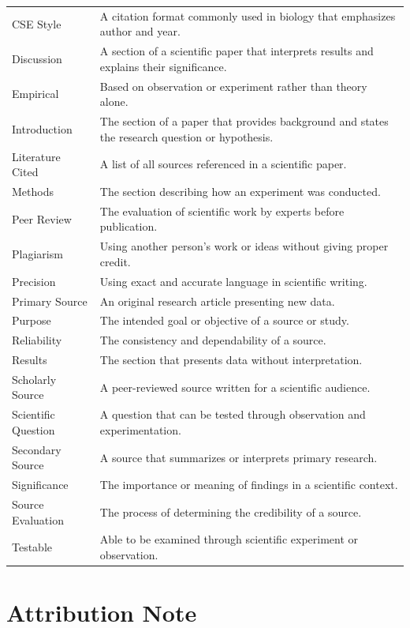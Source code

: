 \documentclass[
  letterpaper,
  DIV=11,
  numbers=noendperiod]{scrreprt}
\begin{document}
{\begin{longtable}[]{@{}
  >{\raggedright\arraybackslash}p{}
  >{\raggedright\arraybackslash}p{}@{}}
CSE Style & A citation format commonly used in biology that emphasizes
author and year. \\
Discussion & A section of a scientific paper that interprets results and
explains their significance. \\
Empirical & Based on observation or experiment rather than theory
alone. \\
Introduction & The section of a paper that provides background and
states the research question or hypothesis. \\
Literature Cited & A list of all sources referenced in a scientific
paper. \\
Methods & The section describing how an experiment was conducted. \\
Peer Review & The evaluation of scientific work by experts before
publication. \\
Plagiarism & Using another person's work or ideas without giving proper
credit. \\
Precision & Using exact and accurate language in scientific writing. \\
Primary Source & An original research article presenting new data. \\
Purpose & The intended goal or objective of a source or study. \\
Reliability & The consistency and dependability of a source. \\
Results & The section that presents data without interpretation. \\
Scholarly Source & A peer-reviewed source written for a scientific
audience. \\
Scientific Question & A question that can be tested through observation
and experimentation. \\
Secondary Source & A source that summarizes or interprets primary
research. \\
Significance & The importance or meaning of findings in a scientific
context. \\
Source Evaluation & The process of determining the credibility of a
source. \\
Testable & Able to be examined through scientific experiment or
observation. \\
\end{longtable}
}

\section*{\texorpdfstring{\textbf{Attribution
Note}}{Attribution Note}}\label{attribution-note}
\end{document}
